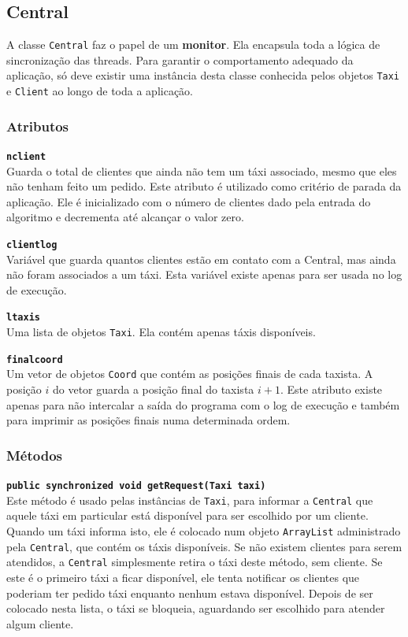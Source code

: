\documentclass[a4paper,landscape,12pt]{article}
\begin{document}
\subsection{Central}
A classe \texttt{Central} faz o papel de um \textbf{monitor}. Ela encapsula toda a lógica de sincronização das threads. Para garantir o comportamento adequado da aplicação, só deve existir uma instância desta classe conhecida pelos objetos \texttt{Taxi} e \texttt{Client} ao longo de toda a aplicação.

\subsubsection{Atributos}
\textbf{\texttt{nclient}} \\
Guarda o total de clientes que ainda não tem um táxi associado, mesmo que eles não tenham feito um pedido. Este atributo é utilizado como critério de parada da aplicação. Ele é inicializado com o número de clientes dado pela entrada do algoritmo e decrementa até alcançar o valor zero.

\textbf{\texttt{clientlog}} \\
Variável que guarda quantos clientes estão em contato com a Central, mas ainda não foram associados a um táxi. Esta variável existe apenas para ser usada no log de execução.

\textbf{\texttt{ltaxis}} \\
Uma lista de objetos \texttt{Taxi}. Ela contém apenas táxis disponíveis.

\textbf{\texttt{finalcoord}} \\
Um vetor de objetos \texttt{Coord} que contém as posições finais de cada taxista. A posição $i$ do vetor guarda a posição final do taxista $i+1$. Este atributo existe apenas para não intercalar a saída do programa com o log de execução e também para imprimir as posições finais numa determinada ordem.

\subsubsection{Métodos}

\textbf{\texttt{public synchronized void getRequest(Taxi taxi)}} \\
Este método é usado pelas instâncias de \texttt{Taxi}, para informar a \texttt{Central} que aquele táxi em particular está disponível para ser escolhido por um cliente. Quando um táxi informa isto, ele é colocado num objeto \texttt{ArrayList} administrado pela \texttt{Central}, que contém os táxis disponíveis. Se não existem clientes para serem atendidos, a \texttt{Central} simplesmente retira o táxi deste método, sem cliente. Se este é o primeiro táxi a ficar disponível, ele tenta notificar os clientes que poderiam ter pedido táxi enquanto nenhum estava disponível. Depois de ser colocado nesta lista, o táxi se bloqueia, aguardando ser escolhido para atender algum cliente.
\end{document}

